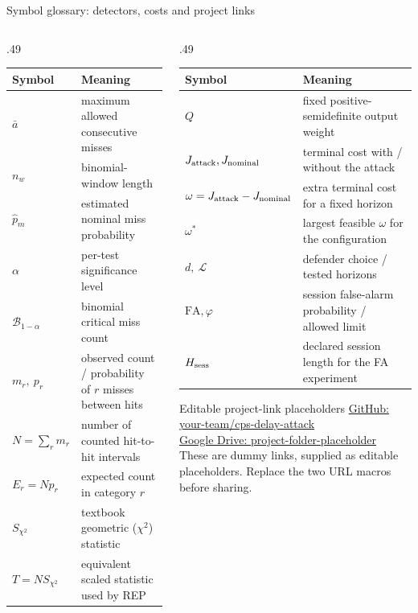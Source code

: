 \documentclass[8pt,aspectratio=169]{beamer}
\newcommand{\CPSOurRepoURL}{https://github.com/your-team/cps-delay-attack}
\newcommand{\CPSOurDriveURL}{https://drive.google.com/drive/folders/project-folder-placeholder}
\gdef\CPSOrigin{PAPER}%
\gdef\CPSSourceContext{}%
\begin{document}
\begin{frame}[label=cps-glossary-links]{Symbol glossary: detectors, costs and project links}
\gdef\CPSSourceContext{}
\gdef\CPSOrigin{KEY}
\footnotesize\renewcommand{\arraystretch}{1.35}
\begin{columns}[T,onlytextwidth]
\begin{column}{.49\textwidth}
\begin{tabularx}{\linewidth}{@{}lX@{}}
\toprule \textbf{Symbol} & \textbf{Meaning}\\\midrule
$\bar a$ & maximum allowed consecutive misses\\
$n_w$ & binomial-window length\\
$\hat p_m$ & estimated nominal miss probability\\
$\alpha$ & per-test significance level\\
$\mathcal B_{1-\alpha}$ & binomial critical miss count\\
$m_r,\ p_r$ & observed count / probability of $r$ misses between hits\\
$N=\sum_r m_r$ & number of counted hit-to-hit intervals\\
$E_r=Np_r$ & expected count in category $r$\\
$S_{\chi^2}$ & textbook geometric ($\chi^2$) statistic\\
$T=N S_{\chi^2}$ & equivalent scaled statistic used by REP\\
\bottomrule
\end{tabularx}
\end{column}
\begin{column}{.49\textwidth}
\begin{tabularx}{\linewidth}{@{}lX@{}}
\toprule \textbf{Symbol} & \textbf{Meaning}\\\midrule
$Q$ & fixed positive-semidefinite output weight\\
$J_{\rm attack},J_{\rm nominal}$ & terminal cost with / without the attack\\
$\omega=J_{\rm attack}-J_{\rm nominal}$ & extra terminal cost for a fixed horizon\\
$\omega^*$ & largest feasible $\omega$ for the configuration\\
$d,\ \mathcal L$ & defender choice / tested horizons\\
$\mathrm{FA},\varphi$ & session false-alarm probability / allowed limit\\
$H_{\rm sess}$ & declared session length for the FA experiment\\
\bottomrule
\end{tabularx}
\vspace{.7em}
\begin{block}{Editable project-link placeholders}
\footnotesize
\href{\CPSOurRepoURL}{GitHub: your-team/cps-delay-attack}\\[.4em]
\href{\CPSOurDriveURL}{Google Drive: project-folder-placeholder}\\[.5em]
These are dummy links, supplied as editable placeholders. Replace the two URL macros before sharing.
\end{block}
\end{column}
\end{columns}
\end{frame}
\end{document}
